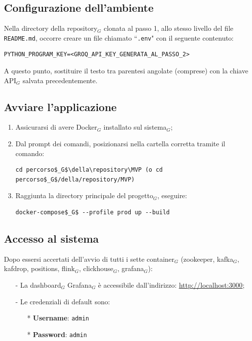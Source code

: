 \documentclass[10pt]{article}
\begin{document}
\begin{justify}
\subsection{Configurazione dell'ambiente}
Nella directory della repository$_G$ clonata al passo 1, allo stesso livello del file \texttt{README.md}, occorre creare un file chiamato ``\texttt{.env}" con il seguente contenuto:
\begin{verbatim}
PYTHON_PROGRAM_KEY=<GROQ_API_KEY_GENERATA_AL_PASSO_2>
\end{verbatim}
A questo punto, sostituire il testo tra parentesi angolate (comprese) con la chiave API$_G$ salvata precedentemente.

\subsection{Avviare l'applicazione}
\begin{enumerate}
    \item Assicurarsi di avere Docker$_G$ installato sul sistema$_G$;
    \item Dal prompt dei comandi, posizionarsi nella cartella corretta tramite il comando:
\begin{verbatim}
cd percorso$_G$\della\repository\MVP (o cd percorso$_G$/della/repository/MVP)
\end{verbatim}
    \item Raggiunta la directory principale del progetto$_G$, eseguire:
\begin{verbatim}
docker-compose$_G$ --profile prod up --build
\end{verbatim}
\end{enumerate}

\subsection{Accesso al sistema}
Dopo essersi accertati dell'avvio di tutti i sette container$_G$ (zookeeper, kafka$_G$, kafdrop, positions, flink$_G$, clickhouse$_G$, grafana$_G$):
\begin{itemize}
    \item[-] La dashboard$_G$ Grafana$_G$ è accessibile dall'indirizzo: \url{http://localhost:3000};
    \item[-] Le credenziali di default sono:
    \begin{itemize}
        \item[*] \textbf{Username}: \texttt{admin}
        \item[*] \textbf{Password}: \texttt{admin}
    \end{itemize}
\end{itemize}


\end{justify}
\end{document}
